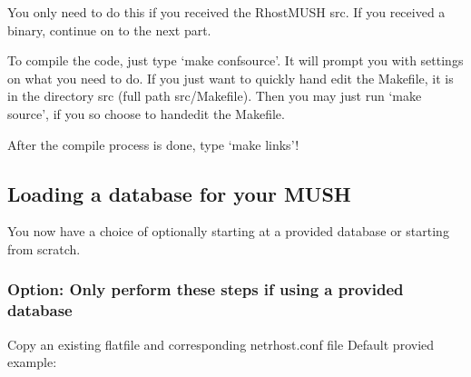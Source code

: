 \documentclass[letterpaper,10pt,english]{sphinxmanual}
\begin{document}
\sphinxAtStartPar
You only need to do this if you received the RhostMUSH src.  If you received a binary, continue on to the next part.

\sphinxAtStartPar
To compile the code, just type ‘make confsource’.  It will prompt you with settings on what you need to do.  If you just want to quickly hand edit the Makefile, it is in the directory src (full path src/Makefile).  Then you may just run ‘make source’, if you so choose to hand\sphinxhyphen{}edit the Makefile.

\sphinxAtStartPar
After the compile process is done, type ‘make links’!


\subsection{Loading a database for your MUSH}
\label{\detokenize{install:loading-a-database-for-your-mush}}
\sphinxAtStartPar
You now have a choice of optionally starting at a provided database or starting from scratch.


\subsubsection{Option: Only perform these steps if using a provided database}
\label{\detokenize{install:option-only-perform-these-steps-if-using-a-provided-database}}
\sphinxAtStartPar
Copy an existing flatfile and corresponding netrhost.conf file Default provied example:

\begin{sphinxVerbatim}[commandchars=\\\{\}]
  
   
 
   
\end{sphinxVerbatim}
\end{document}
